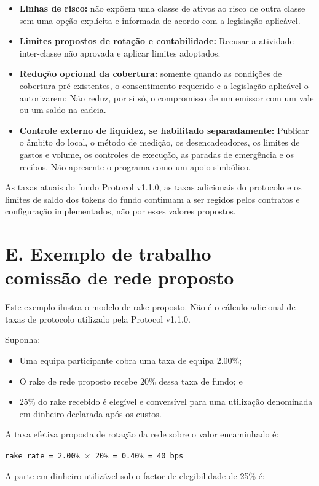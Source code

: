 \documentclass[11pt]{article}
\begin{document}
\begin{itemize}[leftmargin=*]
\item \textbf{Linhas de risco:} não expõem uma classe de ativos ao risco de outra classe sem uma opção explícita e informada de acordo com a legislação aplicável.
\item \textbf{Limites propostos de rotação e contabilidade:} Recusar a atividade inter-classe não aprovada e aplicar limites adoptados.
\item \textbf{Redução opcional da cobertura:} somente quando as condições de cobertura pré-existentes, o consentimento requerido e a legislação aplicável o autorizarem; Não reduz, por si só, o compromisso de um emissor com um vale ou um saldo na cadeia.
\item \textbf{Controle externo de liquidez, se habilitado separadamente:} Publicar o âmbito do local, o método de medição, os desencadeadores, os limites de gastos e volume, os controles de execução, as paradas de emergência e os recibos. Não apresente o programa como um apoio simbólico.
\end{itemize}
As taxas atuais do fundo Protocol v1.1.0, as taxas adicionais do protocolo e os limites de saldo dos tokens do fundo continuam a ser regidos pelos contratos e configuração implementados, não por esses valores propostos.


\section*{E. Exemplo de trabalho --- comissão de rede proposto}

Este exemplo ilustra o modelo de rake proposto. Não é o cálculo adicional de taxas de protocolo utilizado pela Protocol v1.1.0.

Suponha:

\begin{itemize}[leftmargin=*]
\item Uma equipa participante cobra uma taxa de equipa 2.00\%;
\item O rake de rede proposto recebe 20\% dessa taxa de fundo; e
\item 25\% do rake recebido é elegível e conversível para uma utilização denominada em dinheiro declarada após os custos.
\end{itemize}
A taxa efetiva proposta de rotação da rede sobre o valor encaminhado é:

\texttt{rake\_rate = 2.00\% $\times$ 20\% = 0.40\% = 40 bps}

A parte em dinheiro utilizável sob o factor de elegibilidade de 25\% é:
\end{document}
